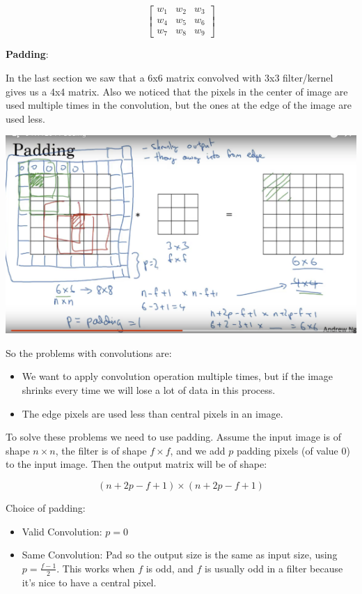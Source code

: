 \documentclass{article}
\begin{document}
\[
\begin{bmatrix}
w_{1} & w_{2} & w_{3}\\
w_{4} & w_{5} & w_{6}\\
w_{7} & w_{8} & w_{9}
\end{bmatrix}
\]

\noindent \textbf{Padding}:

\noindent In the last section we saw that a 6x6 matrix convolved with 3x3 filter/kernel gives us a 4x4 matrix. Also we noticed that the pixels in the center of image are used multiple times in the convolution, but the ones at the edge of the image are used less.

\begin{center}
\includegraphics[scale=0.4]{./images/padding.png}
\end{center}

\noindent So the problems with convolutions are:

\begin{itemize}
    \item We want to apply convolution operation multiple times, but if the image shrinks every time we will lose a lot of data in this process.
    \item The edge pixels are used less than central pixels in an image.
\end{itemize}

\noindent To solve these problems we need to use padding. Assume the input image is of shape \(n \times n\), the filter is of shape \(f \times f\), and we add \(p\) padding pixels (of value 0) to the input image. Then the output matrix will be of shape:

\[(n + 2p - f + 1) \times (n + 2p - f + 1)\]

\noindent Choice of padding:

\begin{itemize}
    \item Valid Convolution: \(p = 0\)
    \item Same Convolution: Pad so the output size is the same as input size, using \(p = \frac{f - 1}{2}\). This works when \(f\) is odd, and \(f\) is usually odd in a filter because it's nice to have a central pixel.
\end{itemize}
\end{document}
